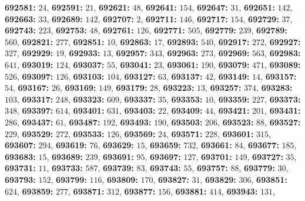 \textsf{\bfseries 692581:} $24$, \textsf{\bfseries 692591:} $21$, \textsf{\bfseries 692621:} $48$, \textsf{\bfseries 692641:} $154$, \textsf{\bfseries 692647:} $31$, \textsf{\bfseries 692651:} $142$, \textsf{\bfseries 692663:} $33$, \textsf{\bfseries 692689:} $142$, \textsf{\bfseries 692707:} $2$, \textsf{\bfseries 692711:} $146$, \textsf{\bfseries 692717:} $154$, \textsf{\bfseries 692729:} $37$, \textsf{\bfseries 692743:} $223$, \textsf{\bfseries 692753:} $48$, \textsf{\bfseries 692761:} $126$, \textsf{\bfseries 692771:} $505$, \textsf{\bfseries 692779:} $239$, \textsf{\bfseries 692789:} $560$, \textsf{\bfseries 692821:} $277$, \textsf{\bfseries 692851:} $10$, \textsf{\bfseries 692863:} $17$, \textsf{\bfseries 692893:} $540$, \textsf{\bfseries 692917:} $272$, \textsf{\bfseries 692927:} $327$, \textsf{\bfseries 692929:} $19$, \textsf{\bfseries 692933:} $13$, \textsf{\bfseries 692957:} $343$, \textsf{\bfseries 692963:} $273$, \textsf{\bfseries 692969:} $563$, \textsf{\bfseries 692983:} $641$, \textsf{\bfseries 693019:} $124$, \textsf{\bfseries 693037:} $55$, \textsf{\bfseries 693041:} $23$, \textsf{\bfseries 693061:} $190$, \textsf{\bfseries 693079:} $471$, \textsf{\bfseries 693089:} $526$, \textsf{\bfseries 693097:} $126$, \textsf{\bfseries 693103:} $104$, \textsf{\bfseries 693127:} $63$, \textsf{\bfseries 693137:} $42$, \textsf{\bfseries 693149:} $14$, \textsf{\bfseries 693157:} $54$, \textsf{\bfseries 693167:} $26$, \textsf{\bfseries 693169:} $149$, \textsf{\bfseries 693179:} $28$, \textsf{\bfseries 693223:} $13$, \textsf{\bfseries 693257:} $374$, \textsf{\bfseries 693283:} $103$, \textsf{\bfseries 693317:} $248$, \textsf{\bfseries 693323:} $609$, \textsf{\bfseries 693337:} $35$, \textsf{\bfseries 693353:} $10$, \textsf{\bfseries 693359:} $227$, \textsf{\bfseries 693373:} $348$, \textsf{\bfseries 693397:} $614$, \textsf{\bfseries 693401:} $631$, \textsf{\bfseries 693403:} $22$, \textsf{\bfseries 693409:} $44$, \textsf{\bfseries 693421:} $201$, \textsf{\bfseries 693431:} $286$, \textsf{\bfseries 693437:} $61$, \textsf{\bfseries 693487:} $192$, \textsf{\bfseries 693493:} $190$, \textsf{\bfseries 693503:} $206$, \textsf{\bfseries 693523:} $88$, \textsf{\bfseries 693527:} $229$, \textsf{\bfseries 693529:} $272$, \textsf{\bfseries 693533:} $126$, \textsf{\bfseries 693569:} $24$, \textsf{\bfseries 693571:} $228$, \textsf{\bfseries 693601:} $315$, \textsf{\bfseries 693607:} $294$, \textsf{\bfseries 693619:} $76$, \textsf{\bfseries 693629:} $15$, \textsf{\bfseries 693659:} $732$, \textsf{\bfseries 693661:} $84$, \textsf{\bfseries 693677:} $185$, \textsf{\bfseries 693683:} $15$, \textsf{\bfseries 693689:} $239$, \textsf{\bfseries 693691:} $95$, \textsf{\bfseries 693697:} $127$, \textsf{\bfseries 693701:} $149$, \textsf{\bfseries 693727:} $35$, \textsf{\bfseries 693731:} $11$, \textsf{\bfseries 693733:} $587$, \textsf{\bfseries 693739:} $83$, \textsf{\bfseries 693743:} $55$, \textsf{\bfseries 693757:} $88$, \textsf{\bfseries 693779:} $30$, \textsf{\bfseries 693793:} $152$, \textsf{\bfseries 693799:} $116$, \textsf{\bfseries 693809:} $170$, \textsf{\bfseries 693827:} $31$, \textsf{\bfseries 693829:} $306$, \textsf{\bfseries 693851:} $624$, \textsf{\bfseries 693859:} $277$, \textsf{\bfseries 693871:} $312$, \textsf{\bfseries 693877:} $156$, \textsf{\bfseries 693881:} $414$, \textsf{\bfseries 693943:} $131$, 
